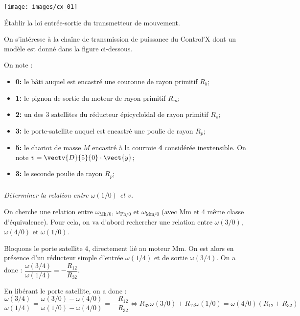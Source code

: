 \documentclass[10pt,fleqn]{article} %
\begin{document}
\begin{multicols}{2}
\begin{center}
\texttt{[image: images/cx\_01]}
\end{center}

\begin{obj} Établir la loi entrée-sortie du transmetteur de mouvement. 
\end{obj}


On s'intéresse à la chaîne de transmission de puissance du Control'X dont un modèle est donné dans la figure ci-dessous.

On note : 
\begin{itemize}
\item \textbf{0:} le bâti auquel est encastré une couronne de rayon primitif $R_b$;
\item \textbf{1:} le pignon de sortie du moteur de rayon primitif $R_m$;
\item \textbf{2:} un des 3 satellites du réducteur épicycloïdal de rayon primitif $R_s$;
\item \textbf{3:} le porte-satellite auquel est encastré une poulie de rayon $R_p$;
\item \textbf{5:} le chariot de masse $M$ encastré à la courroie \textbf{4} considérée inextensible. On note $v=\vectv{D}{5}{0}\cdot \vect{y}$;
\item \textbf{3:} le seconde poulie de rayon $R_p$;
\end{itemize}
\subparagraph{}
\textit{Déterminer la relation entre $\omega(1/0)$ et $v$.}



\ifprof
\begin{corrige}
On cherche une relation entre $\omega_{\text{Mh}/0}$, $\omega_{\text{Ph}/0}$ et $\omega_{\text{Mm}/0}$ (avec Mm et 4 même classe d'équivalence). Pour cela, on va d'abord rechercher une relation entre $\omega(3/0)$, $\omega(4/0)$ et $\omega(1/0)$.

Bloquons le porte satellite 4, directement lié au moteur Mm. On est alors en présence d'un réducteur simple d'entrée  $\omega(1/4)$ et de sortie $\omega(3/4)$. On a donc : 
$\dfrac{\omega(3/4)}{\omega(1/4)} = -\dfrac{R_{12}}{R_{32}}$. 

En libérant le porte satellite, on a donc :
$ \dfrac{\omega(3/4)}{\omega(1/4)}
= \dfrac{\omega(3/0)-\omega(4/0)}{\omega(1/0)-\omega(4/0)}
= -\dfrac{R_{12}}{R_{32}}
\Leftrightarrow 
R_{32} \omega(3/0) +R_{12}\omega(1/0) = \omega(4/0)\left(R_{12}+R_{32}\right)$


\end{corrige}
\end{multicols}
\end{document}
